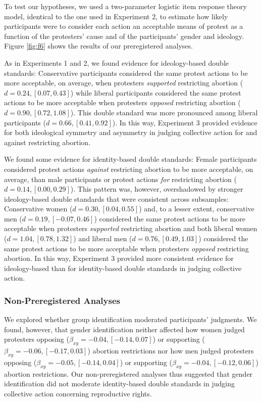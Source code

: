 \documentclass[12pt, letterpaper]{article}
\begin{document}
To test our hypotheses, we used a two-parameter logistic item response
theory model, identical to the one used in Experiment 2, to estimate how
likely participants were to consider each action an acceptable means of
protest as a function of the protesters' cause and of the participants'
gender and ideology. Figure \ref{fig:f6} shows the results of our
preregistered analyses.

As in Experiments 1 and 2, we found evidence for ideology-based double
standards: Conservative participants considered the same protest actions
to be more acceptable, on average, when protesters \emph{supported}
restricting abortion (\(d = 0.24, [0.07, 0.43]\)) while liberal
participants considered the same protest actions to be more acceptable
when protesters \emph{opposed} restricting abortion
(\(d = 0.90, [0.72, 1.08]\)). This double standard was more pronounced
among liberal participants (\(d = 0.66, [0.41, 0.92]\)). In this way,
Experiment 3 provided evidence for both ideological symmetry and
asymmetry in judging collective action for and against restricting
abortion.

We found some evidence for identity-based double standards: Female
participants considered protest actions \emph{against} restricting
abortion to be more acceptable, on average, than male participants or
protest actions \emph{for} restricting abortion
(\(d = 0.14, [0.00, 0.29]\)). This pattern was, however, overshadowed by
stronger ideology-based double standards that were consistent across
subsamples: Conservative women (\(d = 0.30, [0.04, 0.55]\)) and, to a
lesser extent, conservative men (\(d = 0.19, [-0.07, 0.46]\)) considered
the same protest actions to be more acceptable when protesters
\emph{supported} restricting abortion and both liberal women
(\(d = 1.04, [0.78, 1.32]\)) and liberal men
(\(d = 0.76, [0.49, 1.03]\)) considered the same protest actions to be
more acceptable when protesters \emph{opposed} restricting abortion. In
this way, Experiment 3 provided more consistent evidence for
ideology-based than for identity-based double standards in judging
collective action.

\hypertarget{non-preregistered-analyses-2}{%
\subsubsection{Non-Preregistered
Analyses}\label{non-preregistered-analyses-2}}

We explored whether group identification moderated participants'
judgments. We found, however, that gender identification neither
affected how women judged protesters opposing
(\(\beta_{xy} = -0.04, [-0.14, 0.07]\)) or supporting
(\(\beta_{xy} = -0.06, [-0.17, 0.03]\)) abortion restrictions nor how
men judged protesters opposing (\(\beta_{xy} = -0.05, [-0.14, 0.04]\))
or supporting (\(\beta_{xy} = -0.04, [-0.12, 0.06]\)) abortion
restrictions. Our non-preregistered analyses thus suggested that gender
identification did not moderate identity-based double standards in
judging collective action concerning reproductive rights.
\end{document}
